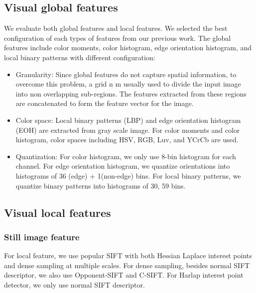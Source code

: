 \documentclass[twocolumn]{bmcart}%
\begin{document}
\subsection{Visual global features}

We evaluate both global features and local features. We selected the best configuration of each types of features from our previous work\cite{lam2012nii}. The global features include color moments, color histogram, edge orientation histogram, and local binary patterns with different configuration:

\begin{itemize}
	\item Granularity:  Since global features do not capture spatial information, to overcome this problem, a grid n  m usually used to divide the input image into non overlapping sub-regions. The features extracted from these regions are concatenated to form the feature vector for the image.
	\item Color space: Local binary patterns (LBP) and edge orientation histogram (EOH) are extracted from gray scale image. For color moments and color histogram, color spaces including HSV, RGB, Luv, and YCrCb are used.
	\item Quantization: For color histogram, we only use 8-bin histogram for each channel. For edge orientation histogram, we quantize orientations into histograms of 36 (edge) + 1(non-edge) bins. For local binary patterns, we quantize binary patterns into histograms of 30, 59 bins.
\end{itemize}

\subsection{Visual local features}
\subsubsection{Still image feature}

For local feature, we use popular SIFT with both Hessian Laplace interest points and dense sampling at multiple scales. For dense sampling, besides normal SIFT descriptor, we also use Opponent-SIFT and C-SIFT. For Harlap interest point detector, we only use normal SIFT descriptor.	
\end{document}

